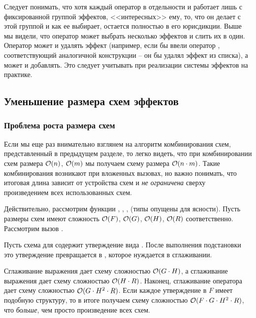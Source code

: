 Следует понимать, что хотя каждый оператор в отдельности и работает лишь с фиксированной группой эффектов, <<интересных>> ему, то, что он делает с этой группой и как ее выбирает, остается полностью в его юрисдикции. Выше мы видели, что оператор может выбрать несколько эффектов и слить их в один. Оператор может и удалять эффект (например, если бы ввели оператор , соответствующий аналогичной конструкции -- он бы удалял эффект  из списка), а может и добавлять. Это следует учитывать при реализации системы эффектов на практике.



\subsection{Уменьшение размера схем эффектов}

\label{section-schemas-reducing}

\subsubsection{Проблема роста размера схем}

Если мы еще раз внимательно взглянем на алгоритм комбинирования схем, представленный в предыдущем разделе, то легко видеть, что при комбинировании схем размера $\mathcal{O}(n)$, $\mathcal{O}(m)$ мы получаем схему размера $\mathcal{O}(n \cdot m)$. Такие комбинирования возникают при вложенных вызовах, но важно понимать, что итоговая длина зависит от устройства схем и \emph{не ограничена} сверху произведением всех использованных схем. 

Действительно, рассмотрим функции , , ,  (типы опущены для ясности). Пусть размеры схем имеют сложность $\mathcal{O}(F)$, $\mathcal{O}(G)$, $\mathcal{O}(H)$, $\mathcal{O}(R)$ соответственно. Рассмотрим вызов . 

Пусть схема для  содержит утверждение вида . После выполнения подстановки это утверждение превращается в , которое нуждается в сглаживании. 

Сглаживание выражения  дает схему сложностью $\mathcal{O}(G \cdot H)$, а сглаживание выражения  дает схему сложностью $\mathcal{O}(H \cdot R)$. Наконец, сглаживание оператора \code{==} дает схему сложностью $\mathcal{O}(G \cdot H^2 \cdot R)$. Если каждое утверждение в $F$ имеет подобную структуру, то в итоге получаем схему сложностью $\mathcal{O}(F \cdot G \cdot H^2 \cdot R)$, что \emph{больше}, чем просто произведение всех схем.


